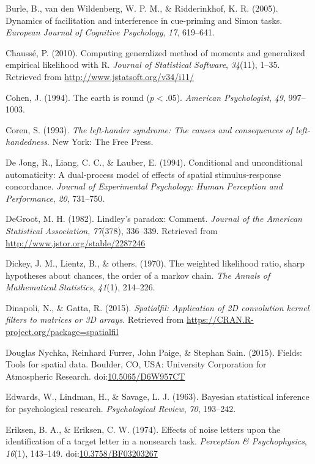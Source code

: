 \documentclass[american,man]{apa6}
\begin{document}
Burle, B., {van den Wildenberg}, W. P. M., \& Ridderinkhof, K. R.
(2005). Dynamics of facilitation and interference in cue-priming and
Simon tasks. \emph{European Journal of Cognitive Psychology}, \emph{17},
619--641.

Chauss{é}, P. (2010). Computing generalized method of moments and
generalized empirical likelihood with R. \emph{Journal of Statistical
Software}, \emph{34}(11), 1--35. Retrieved from
\url{http://www.jstatsoft.org/v34/i11/}

Cohen, J. (1994). The earth is round (\(p<.05\)). \emph{American
Psychologist}, \emph{49}, 997--1003.

Coren, S. (1993). \emph{The left-hander syndrome: The causes and
consequences of left-handedness}. New York: The Free Press.

{De Jong}, R., Liang, C. C., \& Lauber, E. (1994). Conditional and
unconditional automaticity: A dual-process model of effects of spatial
stimulus-response concordance. \emph{Journal of Experimental Psychology:
Human Perception and Performance}, \emph{20}, 731--750.

DeGroot, M. H. (1982). Lindley's paradox: Comment. \emph{Journal of the
American Statistical Association}, \emph{77}(378), 336--339. Retrieved
from \url{http://www.jstor.org/stable/2287246}

Dickey, J. M., Lientz, B., \& others. (1970). The weighted likelihood
ratio, sharp hypotheses about chances, the order of a markov chain.
\emph{The Annals of Mathematical Statistics}, \emph{41}(1), 214--226.

Dinapoli, N., \& Gatta, R. (2015). \emph{Spatialfil: Application of 2D
convolution kernel filters to matrices or 3D arrays}. Retrieved from
\url{https://CRAN.R-project.org/package=spatialfil}

Douglas Nychka, Reinhard Furrer, John Paige, \& Stephan Sain. (2015).
Fields: Tools for spatial data. Boulder, CO, USA: University Corporation
for Atmospheric Research.
doi:\href{http://dx.doi.org/10.5065/D6W957CT}{10.5065/D6W957CT}

Edwards, W., Lindman, H., \& Savage, L. J. (1963). Bayesian statistical
inference for psychological research. \emph{Psychological Review},
\emph{70}, 193--242.

Eriksen, B. A., \& Eriksen, C. W. (1974). Effects of noise letters upon
the identification of a target letter in a nonsearch task.
\emph{Perception \& Psychophysics}, \emph{16}(1), 143--149.
doi:\href{http://dx.doi.org/10.3758/BF03203267}{10.3758/BF03203267}
\end{document}
